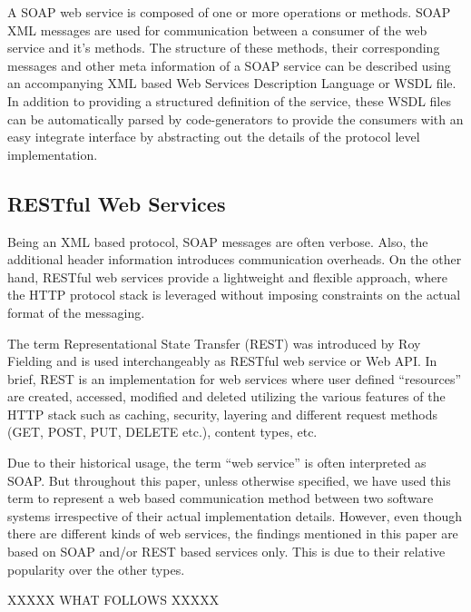 \documentclass[runningheads,a4paper]{llncs}
\begin{document}
A SOAP web service is composed of one or more operations or methods. SOAP XML messages are used for communication between a consumer of the web service and it’s methods. The structure of these methods, their corresponding messages and other meta information of a SOAP service can be described using an accompanying XML based Web Services Description Language or WSDL file. In addition to providing a structured definition of the service, these WSDL files can be automatically parsed by code-generators to provide the consumers with an easy integrate interface by abstracting out the details of the protocol level implementation.


\subsection{RESTful Web Services} %
\label{sub:restful_web_services}
Being an XML based protocol, SOAP messages are often verbose. Also, the additional header information introduces communication overheads. On the other hand, RESTful web services provide a lightweight and flexible approach, where the HTTP protocol stack is leveraged without imposing constraints on the actual format of the messaging.

The term Representational State Transfer (REST) was introduced by Roy Fielding \cite{rest_wiki} and is used interchangeably as RESTful web service or Web API. In brief, REST is an implementation for web services where user defined ``resources'' are created, accessed, modified and deleted utilizing the various features of the HTTP stack such as caching, security, layering and different request methods (GET, POST, PUT, DELETE etc.), content types, etc.

Due to their historical usage, the term ``web service'' is often interpreted as SOAP. But throughout this paper, unless otherwise specified, we have used this term to represent a web based communication method between two software systems irrespective of their actual implementation details. However, even though there are different kinds of web services, the findings mentioned in this paper are based on SOAP and/or REST based services only. This is due to their relative popularity over the other types.


XXXXX WHAT FOLLOWS XXXXX
\end{document}
